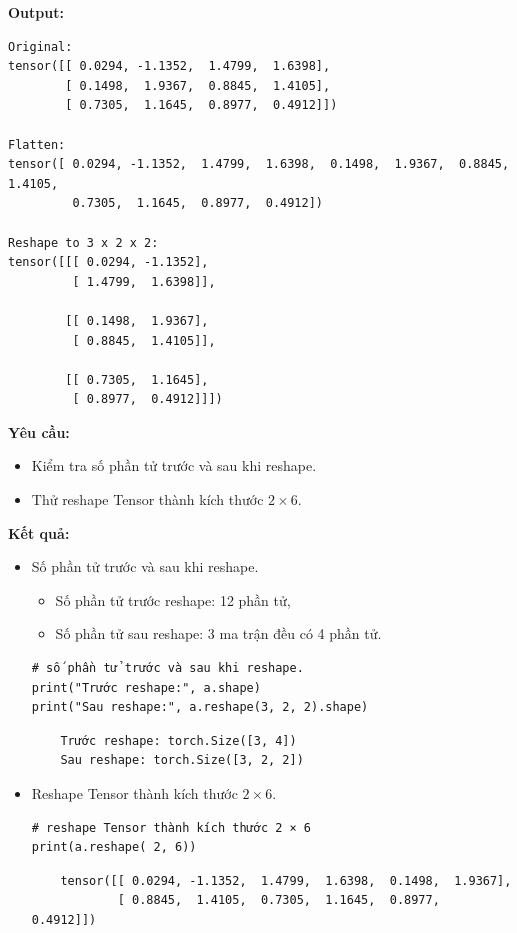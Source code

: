 \documentclass[12pt,a4paper]{article}
\begin{document}
\textbf{Output:}
\begin{verbatim}
Original:
tensor([[ 0.0294, -1.1352,  1.4799,  1.6398],
        [ 0.1498,  1.9367,  0.8845,  1.4105],
        [ 0.7305,  1.1645,  0.8977,  0.4912]])

Flatten:
tensor([ 0.0294, -1.1352,  1.4799,  1.6398,  0.1498,  1.9367,  0.8845,  1.4105,
         0.7305,  1.1645,  0.8977,  0.4912])

Reshape to 3 x 2 x 2:
tensor([[[ 0.0294, -1.1352],
         [ 1.4799,  1.6398]],

        [[ 0.1498,  1.9367],
         [ 0.8845,  1.4105]],

        [[ 0.7305,  1.1645],
         [ 0.8977,  0.4912]]])
\end{verbatim}

\textbf{Yêu cầu:}
\begin{itemize}
    \item Kiểm tra số phần tử trước và sau khi reshape.
    \item Thử reshape Tensor thành kích thước $2 \times 6$.
\end{itemize}

\textbf{Kết quả:}
\begin{itemize}
    \item Số phần tử trước và sau khi reshape.
    \begin{itemize}
        \item Số phần tử trước reshape: 12 phần tử, 
        \item Số phần tử sau reshape: 3 ma trận đều có 4 phần tử.
    \end{itemize}
    \begin{verbatim}
# số phần tử trước và sau khi reshape.
print("Trước reshape:", a.shape)
print("Sau reshape:", a.reshape(3, 2, 2).shape)
\end{verbatim}

    \begin{verbatim}
    Trước reshape: torch.Size([3, 4])
    Sau reshape: torch.Size([3, 2, 2])
    \end{verbatim}
    
    \item Reshape Tensor thành kích thước $2 \times 6$.
    \begin{verbatim}
# reshape Tensor thành kích thước 2 × 6
print(a.reshape( 2, 6))
\end{verbatim}

    \begin{verbatim}
    tensor([[ 0.0294, -1.1352,  1.4799,  1.6398,  0.1498,  1.9367],
            [ 0.8845,  1.4105,  0.7305,  1.1645,  0.8977,  0.4912]])
    \end{verbatim}
\end{itemize}
\end{document}
